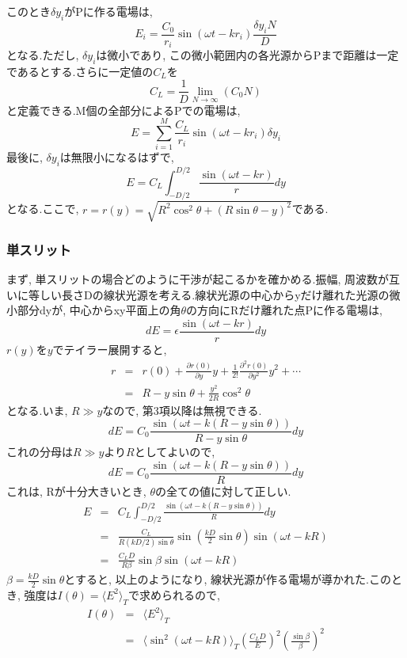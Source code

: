 \clearpage
このとき$\delta y_i$がPに作る電場は, 
\[
  E_i = \frac{C_0}{r_i} \sin(\omega t- k r_i ) \frac{\delta y_i N}{D}
\]
となる.ただし, $\delta y_i$は微小であり, この微小範囲内の各光源からPまで距離は一定であるとする.さらに一定値の$C_L$を
\[
  C_L = \frac{1}{D}  \lim_{N \to \infty} (C_0 N)
\]
と定義できる.M個の全部分によるPでの電場は, 
\[
  E = \sum_{i=1}^M \frac{C_L}{r_i} \sin(\omega t - k r_i) \delta y_i
\]
最後に, $\delta y_i$は無限小になるはずで, 
\[
  E = C_L \int_{-D/2}^{D/2} \frac{\sin(\omega t - k r)}{r} dy
\]
となる.ここで, $r = r(y)=\sqrt{R^2 \cos^2 \theta + (R\sin \theta - y )^2}$である.


\subsubsection{単スリット}
まず, 単スリットの場合どのように干渉が起こるかを確かめる.振幅, 周波数が互いに等しい長さDの線状光源を考える.線状光源の中心からyだけ離れた光源の微小部分dyが, 中心からxy平面上の角$\theta$の方向にRだけ離れた点Pに作る電場は, 
\[
  dE = \epsilon \frac{\sin(\omega t - kr)}{r} dy
\]
$r(y)$を$y$でテイラー展開すると, 
\begin{eqnarray*}
  r &=&r(0) + \frac{\partial r(0)}{\partial y} y + \frac{1}{2!} \frac{\partial^2 r(0)}{\partial y^2} y^2 + \cdots \\
  &=&R - y\sin\theta + \frac{y^2}{2R} \cos^2 \theta
\end{eqnarray*}
となる.いま, $R \gg y$なので, 第3項以降は無視できる.
\[
  dE = C_0 \frac{\sin(\omega t -k(R- y\sin \theta ))}{R- y \sin\theta} dy
\]
これの分母は$R \gg y$より$R$としてよいので, 
\[
  dE = C_0 \frac{\sin(\omega t -k(R- y\sin \theta ))}{R} dy
\]
これは, Rが十分大きいとき, $\theta$の全ての値に対して正しい.
\begin{eqnarray*}
  E &=& C_L \int_{-D/2}^{D/2} \frac{\sin(\omega t - k( R - y\sin\theta ))}{R} dy \\
  &=& \frac{C_L}{R(kD/2)\sin\theta} \sin\left(\frac{kD}{2} \sin \theta \right) \sin(\omega t -kR) \\
  &=& \frac{C_L D}{R\beta} \sin \beta \sin(\omega t - kR)
\end{eqnarray*}
$\beta = \frac{kD}{2} \sin\theta$とすると, 以上のようになり, 線状光源が作る電場が導かれた.このとき, 強度は$I(\theta) = \langle E^2\rangle_T$で求められるので, 
\begin{eqnarray*}
  I(\theta) &=& \langle E^2 \rangle_T\\
  &=& \langle \sin^2(\omega t - kR)\rangle_T \left(\frac{C_L D}{E}\right)^2 \left(\frac{\sin\beta}{\beta}\right)^2
\end{eqnarray*}
